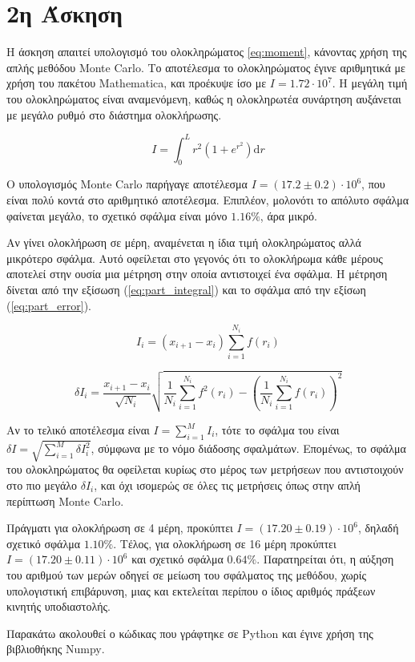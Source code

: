 \documentclass[assignment1.tex]{subfiles}
\begin{document}
\section*{2η Άσκηση}

Η άσκηση απαιτεί υπολογισμό του ολοκληρώματος \ref{eq:moment}, κάνοντας χρήση της απλής μεθόδου \textlatin{Monte Carlo}. Το αποτέλεσμα το ολοκληρώματος έγινε αριθμητικά με χρήση του πακέτου \textlatin{Mathematica}, και προέκυψε ίσο με $I=1.72\cdot10^7$. Η μεγάλη τιμή του ολοκληρώματος είναι αναμενόμενη, καθώς η ολοκληρωτέα συνάρτηση αυξάνεται με μεγάλο ρυθμό στο διάστημα ολοκλήρωσης.

\begin{equation}
I=\int_0^L r^2\left(1+e^{r^2}\right) \mathrm{d}r
\label{eq:moment}
\end{equation}


Ο υπολογισμός \textlatin{Monte Carlo} παρήγαγε αποτέλεσμα $I=(17.2 \pm 0.2)\cdot 10^6$, που είναι πολύ κοντά στο αριθμητικό αποτέλεσμα. Επιπλέον, μολονότι το απόλυτο σφάλμα φαίνεται μεγάλο, το σχετικό σφάλμα είναι μόνο $1.16\%$, άρα μικρό.

Αν γίνει ολοκλήρωση σε μέρη, αναμένεται η ίδια τιμή ολοκληρώματος αλλά μικρότερο σφάλμα. Αυτό οφείλεται στο γεγονός ότι το ολοκλήρωμα κάθε μέρους αποτελεί στην ουσία μια μέτρηση στην οποία αντιστοιχεί ένα σφάλμα. Η μέτρηση δίνεται από την εξίσωση (\ref{eq:part_integral}) και το σφάλμα από την εξίσωη (\ref{eq:part_error}). 

\begin{equation}
I_i = (x_{i+1}-x_i) \sum_{i=1}^{N_i} f(r_i) 
\label{eq:part_integral}
\end{equation}

\begin{equation}
\delta I_i = \frac{x_{i+1}-x_i}{\sqrt{N_i}} \sqrt{\frac{1}{N_i}\sum_{i=1}^{N_i} f^2(r_i) - \left( \frac{1}{N_i}\sum_{i=1}^{N_i} f(r_i) \right)^2}
\label{eq:part_error}
\end{equation}

Αν το τελικό αποτέλεσμα είναι $I=\sum_{i=1}^{M} I_i$, τότε το σφάλμα του είναι $\delta I = \sqrt{\sum_{i=1}^{M}\delta I_i^2}$, σύμφωνα με το νόμο διάδοσης σφαλμάτων. Επομένως, το σφάλμα του ολοκληρώματος θα οφείλεται κυρίως στο μέρος των μετρήσεων που αντιστοιχούν στο πιο μεγάλο $\delta I_i$, και όχι ισομερώς σε όλες τις μετρήσεις όπως στην απλή περίπτωση \textlatin{Monte Carlo}.


Πράγματι για ολοκλήρωση σε 4 μέρη, προκύπτει $I=(17.20 \pm 0.19)\cdot 10^6$, δηλαδή σχετικό σφάλμα $1.10\%$. Τέλος, για ολοκλήρωση σε 16 μέρη προκύπτει $I=(17.20 \pm 0.11)\cdot 10^6$ και σχετικό σφάλμα $0.64\%$. Παρατηρείται ότι, η αύξηση του αριθμού των μερών οδηγεί σε μείωση του σφάλματος της μεθόδου, χωρίς υπολογιστική επιβάρυνση, μιας και εκτελείται περίπου ο ίδιος αριθμός πράξεων κινητής υποδιαστολής.

Παρακάτω ακολουθεί ο κώδικας που γράφτηκε σε \textlatin{Python} και έγινε χρήση της βιβλιοθήκης \textlatin{Numpy}.


\end{document}
